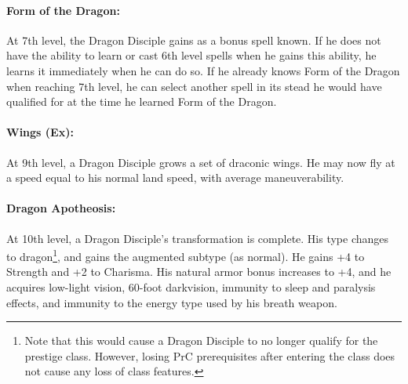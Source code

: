 \paragraph{Form of the Dragon:}
At 7th level, the Dragon Disciple gains  as a bonus spell known.
If he does not have the ability to learn or cast 6th level spells when he gains this ability,
he learns it immediately when he can do so.
If he already knows Form of the Dragon when reaching 7th level, 
he can select another spell in its stead he would have qualified for at the time he learned Form of the Dragon.
\paragraph{Wings (Ex):}
At 9th level, a Dragon Disciple grows a set of draconic wings. 
He may now fly at a speed equal to his normal land speed, with average maneuverability.
\paragraph{Dragon Apotheosis:}
At 10th level, a Dragon Disciple's transformation is complete. His type changes to dragon\footnote{Note that this would cause a Dragon Disciple to no longer qualify for the prestige class. However, losing PrC prerequisites after entering the class does not cause any loss of class features.}, and gains the augmented subtype (as normal).
He gains +4 to Strength and +2 to Charisma.
His natural armor bonus increases to +4, and he acquires low-light vision, 60-foot darkvision, 
immunity to sleep and paralysis effects, and immunity to the energy type used by his breath weapon.